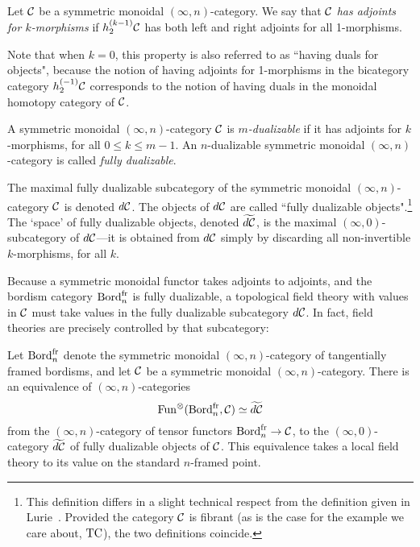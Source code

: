 \documentclass{amsart}
\begin{document}
\begin{appdefinition}
	Let $\mathcal C$ be a symmetric monoidal $(\infty,n)$-category. We say that $\mathcal C$ {\em has adjoints for $k$-morphisms} if $h^{(k-1)}_2 \mathcal C$ has both left and right adjoints for all 1-morphisms. 
\end{appdefinition}

\noindent Note that when $k=0$, this property is also referred to as ``having duals for objects", because the notion of having adjoints for 1-morphisms in the bicategory category $h^{(-1)}_2 \mathcal C$ corresponds to the notion of having duals in the monoidal homotopy category of $\mathcal C$.

\begin{appdefinition}
A symmetric monoidal $(\infty,n)$-category $\mathcal C$ is \emph{$m$-dualizable} if it has adjoints for $k$-morphisms, for all $0 \leq k \leq m-1$.  An $n$-dualizable symmetric monoidal $(\infty,n)$-category is called \emph{fully dualizable}.
\end{appdefinition}

\noindent The maximal fully dualizable subcategory of the symmetric monoidal $(\infty,n)$-category $\mathcal C$ is denoted $d\mathcal C$. The objects of $d\mathcal C$ are called ``fully dualizable objects".\footnote{This definition differs in a slight technical respect from the definition given in Lurie~\cite{lurie-ch}.  Provided the category $\mathcal C$ is fibrant (as is the case for the example we care about, $\mathrm{TC}$), the two definitions coincide.}  The `space' of fully dualizable objects, denoted $\widetilde{d\mathcal C}$, is the maximal $(\infty,0)$-subcategory of $d\mathcal C$---it is obtained from $d\mathcal C$ simply by discarding all non-invertible $k$-morphisms, for all $k$. 

Because a symmetric monoidal functor takes adjoints to adjoints, and the bordism category $\mathrm{Bord}^\mathrm{fr}_n$ is fully dualizable, a topological field theory with values in $\mathcal C$ must take values in the fully dualizable subcategory $d\mathcal C$.  In fact, field theories are precisely controlled by that subcategory:

\begin{apptheorem}
	Let $\mathrm{Bord}^\mathrm{fr}_n$ denote the symmetric monoidal $(\infty,n)$-category of tangentially framed bordisms, and let $\mathcal C$ be a symmetric monoidal $(\infty,n)$-category.  There is an equivalence of $(\infty,n)$-categories
	\begin{equation*}
		\operatorname{Fun}^\otimes(\mathrm{Bord}^\mathrm{fr}_n, \mathcal C) \simeq \widetilde{d\mathcal C}
	\end{equation*} 
from the $(\infty,n)$-category of tensor functors $\mathrm{Bord}^\mathrm{fr}_n \rightarrow \mathcal C$, to the $(\infty,0)$-category $\widetilde{d\mathcal C}$ of fully dualizable objects of $\mathcal C$.  This equivalence takes a local field theory to its value on the standard $n$-framed point.	
\end{apptheorem}
\end{document}
